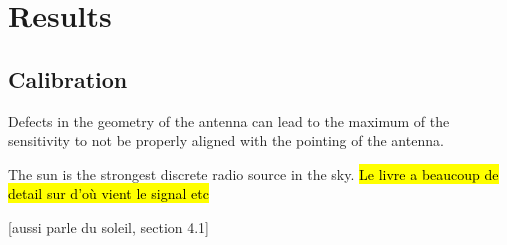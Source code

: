 \section{Results}
\subsection{Calibration}
Defects in the geometry of the antenna can lead to the maximum of the sensitivity to not be properly aligned with the pointing of the antenna.


The sun is the strongest discrete radio source in the sky\cite{burke_introduction_2013}. \hl{Le livre a beaucoup de detail sur d'où vient le signal etc}

[aussi \cite{lauterbach_radio_2022} parle du soleil, section 4.1]